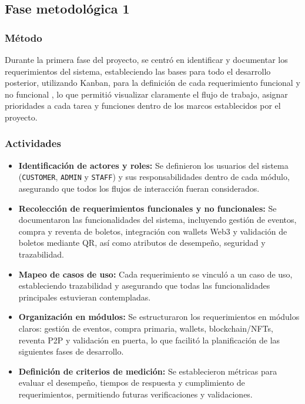 \documentclass[12pt,a4paper]{article}
\begin{document}
\subsection{Fase metodológica 1}
\subsubsection{Método}
Durante la primera fase del proyecto, se centró en identificar y documentar los requerimientos del sistema, estableciendo las bases para todo el desarrollo posterior, utilizando Kanban, para la definición de cada requerimiento funcional y no funcional , lo que permitió visualizar claramente el flujo de trabajo, asignar prioridades a cada tarea y funciones dentro de los marcos establecidos por el proyecto.
\subsubsection{Actividades}
\begin{itemize}
    \item \textbf{Identificación de actores y roles:} Se definieron los usuarios del sistema
    (\texttt{CUSTOMER}, \texttt{ADMIN} y \texttt{STAFF}) y sus responsabilidades
    dentro de cada módulo, asegurando que todos los flujos de interacción fueran
    considerados.

    \item \textbf{Recolección de requerimientos funcionales y no funcionales:} Se
    documentaron las funcionalidades del sistema, incluyendo gestión de eventos,
    compra y reventa de boletos, integración con wallets Web3 y validación de
    boletos mediante QR, así como atributos de desempeño, seguridad y trazabilidad.

    \item \textbf{Mapeo de casos de uso:} Cada requerimiento se vinculó a un caso de
    uso, estableciendo trazabilidad y asegurando que todas las funcionalidades
    principales estuvieran contempladas.

    \item \textbf{Organización en módulos:} Se estructuraron los requerimientos en
    módulos claros: gestión de eventos, compra primaria, wallets,
    blockchain/NFTs, reventa P2P y validación en puerta, lo que facilitó la
    planificación de las siguientes fases de desarrollo.

    \item \textbf{Definición de criterios de medición:} Se establecieron métricas para
    evaluar el desempeño, tiempos de respuesta y cumplimiento de requerimientos,
    permitiendo futuras verificaciones y validaciones.
\end{itemize}
\end{document}
